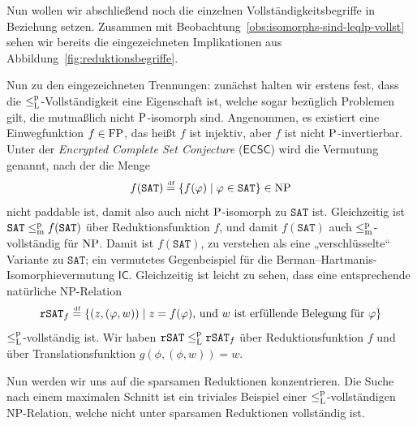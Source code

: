 Nun wollen wir abschließend noch die einzelnen Vollständigkeitsbegriffe in Beziehung setzen.
Zusammen mit Beobachtung~\ref{obs:isomorphs-sind-leqlp-vollst} sehen wir bereits die eingezeichneten Implikationen aus Abbildung~\ref{fig:reduktionsbegriffe}.

Nun zu den eingezeichneten Trennungen: zunächst halten wir erstens fest, dass die $\leqlp$-Vollständigkeit eine Eigenschaft ist, welche sogar bezüglich Problemen gilt, die mutmaßlich nicht $\P$-isomorph sind.
Angenommen, es existiert eine Einwegfunktion $f\in\FP$, das heißt $f$ ist injektiv, aber $f$ ist nicht $\P$-invertierbar.
Unter der \emph{Encrypted Complete Set Conjecture} ($\mathsf{ECSC}$) wird die Vermutung genannt, nach der die Menge
\[ f(\mathtt{SAT}) \defeq \{ f(\phi) \mid \phi\in\mathtt{SAT} \}\in\NP \]
nicht paddable ist, damit also auch nicht $\P$-isomorph zu $\mathtt{SAT}$ ist.
Gleichzeitig ist $\mathtt{SAT}\leqmp f(\mathtt{SAT})$ über Reduktionsfunktion $f$, und damit $f(\mathtt{SAT})$ auch $\leqmp$-vollständig für $\NP$.
Damit ist $f(\mathtt{SAT})$, zu verstehen als eine „verschlüsselte“ Variante zu $\mathtt{SAT}$; ein vermutetes Gegenbeispiel für die Berman–Hartmanis-Isomorphievermutung $\mathsf{IC}$.
Gleichzeitig ist leicht zu sehen, dass eine entsprechende natürliche NP-Relation
\[ \mathtt{rSAT}_f \defeq \{ (z, (\phi, w)) \mid \text{$z=f(\phi)$, und $w$ ist erfüllende Belegung für $\phi$} \} \]
$\leqlp$-vollständig ist. Wir haben $\mathtt{rSAT}\leqlp\mathtt{rSAT}_f$ über Reduktionsfunktion $f$ und über Translationsfunktion $g(\phi, (\phi, w))= w$.




Nun werden wir uns auf die sparsamen Reduktionen konzentrieren. Die Suche nach einem maximalen Schnitt ist ein triviales Beispiel einer $\leqlp$-vollständigen NP-Relation, welche nicht unter sparsamen Reduktionen vollständig ist.


